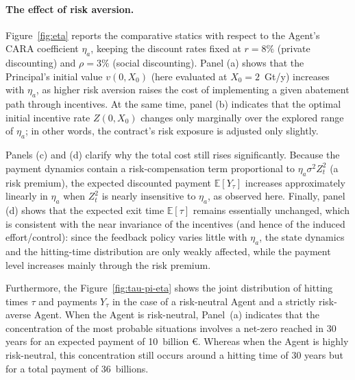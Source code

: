 \documentclass[a4paper,10pt]{article}
\newcommand{\E}{\mathbb{E}}
\theoremstyle{definition}
\theoremstyle{plain}
\numberwithin{equation}{section}
\newcommand{\hs}{\vspace{3mm}}
\begin{document}
\hs

\paragraph{The effect of risk aversion.}

Figure~\ref{fig:eta} reports the comparative statics with respect to the Agent's CARA coefficient $\eta_a$, keeping the discount rates fixed at $r=8\%$ (private discounting) and $\rho=3\%$ (social discounting). Panel (a) shows that the Principal's initial value $v(0,X_0)$ (here evaluated at $X_0=2$~Gt/y) increases with $\eta_a$, as higher risk aversion raises the cost of implementing a given abatement path through incentives. At the same time, panel (b) indicates that the optimal initial incentive rate $Z(0,X_0)$ changes only marginally over the explored range of $\eta_a$; in other words, the contract's risk exposure is adjusted only slightly. 

Panels (c) and (d) clarify why the total cost still rises significantly. Because the payment dynamics contain a risk-compensation term proportional to $\eta_a\sigma^2 Z_t^2$ (a risk premium), the expected discounted payment $\E[Y_\tau]$ increases approximately linearly in $\eta_a$ when $Z_t^2$ is nearly insensitive to $\eta_a$, as observed here. Finally, panel (d) shows that the expected exit time $\E[\tau]$ remains essentially unchanged, which is consistent with the near invariance of the incentives (and hence of the induced effort/control): since the feedback policy varies little with $\eta_a$, the state dynamics and the hitting-time distribution are only weakly affected, while the payment level increases mainly through the risk premium.

\hs

Furthermore, the Figure~\ref{fig:tau-pi-eta} shows the joint distribution of hitting times $\tau$ and payments $Y_\tau$ in the case of a risk-neutral Agent and a strictly risk-averse Agent. When the Agent is risk-neutral, Panel~(a) indicates that the concentration of the most probable situations involves a net-zero reached in 30 years for an expected payment of 10~billion \euro. Whereas when the Agent is highly risk-neutral, this concentration still occurs around a hitting time of 30 years but for a total payment of 36~billions.
\end{document}
